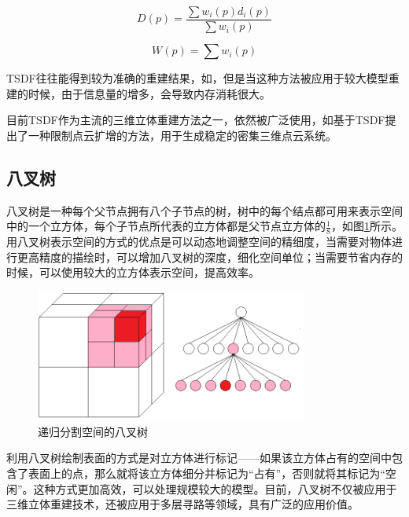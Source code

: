 \documentclass{llncs}
\begin{document}
\begin{CJK}{UTF8}{song}
\begin{equation}
\label{D_cal}
	D(p) = \frac{\sum w_i(p)d_i(p)}{\sum w_i(p)}
\end{equation}

\begin{equation}
\label{W_cal}
	W(p) = \sum w_i(p)
\end{equation}

TSDF往往能得到较为准确的重建结果，如\cite{DBLP:conf/cvpr/FioraioTFSI15,DBLP:conf/icra/ForsterPS14}，但是当这种方法被应用于较大模型重建的时候，由于信息量的增多，会导致内存消耗很大。

目前TSDF作为主流的三维立体重建方法之一，依然被广泛使用，如\cite{DBLP:journals/corr/abs-1710-07242}基于TSDF提出了一种限制点云扩增的方法，用于生成稳定的密集三维点云系统。





	\subsection{八叉树}
八叉树是一种每个父节点拥有八个子节点的树\cite{Wurm2010OctoMap}，树中的每个结点都可用来表示空间中的一个立方体，每个子节点所代表的立方体都是父节点立方体的$\frac{1}{8}$，如图\ref{Octree}所示。用八叉树表示空间的方式的优点是可以动态地调整空间的精细度，当需要对物体进行更高精度的描绘时，可以增加八叉树的深度，细化空间单位；当需要节省内存的时候，可以使用较大的立方体表示空间，提高效率。

\begin{figure}
\centering
\includegraphics[width=0.8\textwidth]{picts/octree.png}
\caption{递归分割空间的八叉树}
\label{Octree}
\end{figure}

利用八叉树绘制表面的方式是对立方体进行标记——如果该立方体占有的空间中包含了表面上的点，那么就将该立方体细分并标记为“占有”，否则就将其标记为“空闲”。这种方式更加高效，可以处理规模较大的模型。目前，八叉树不仅被应用于三维立体重建技术\cite{DBLP:conf/icra/SenguptaS15}，还被应用于多层寻路\cite{DBLP:journals/cgf/JiaZYP18}等领域，具有广泛的应用价值。



\end{CJK}
\end{document}
